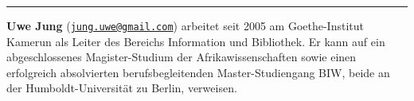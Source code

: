 \documentclass[a4paper,
fontsize=11pt,
oneside,
numbers=noperiodatend,
parskip=half-,
bibliography=totoc,
final
]{scrartcl}
\begin{document}
\begin{center}\rule{0.5\linewidth}{\linethickness}\end{center}

\textbf{Uwe Jung}
(\href{mailto:jung.uwe@gmail.com}{\nolinkurl{jung.uwe@gmail.com}})
arbeitet seit 2005 am Goethe-Institut Kamerun als Leiter des Bereichs
Information und Bibliothek. Er kann auf ein abgeschlossenes
Magister-Studium der Afrikawissenschaften sowie einen erfolgreich
absolvierten berufsbegleitenden Master-Studien\-gang BIW, beide an der
Humboldt-Universität zu Berlin, verweisen.
\end{document}
